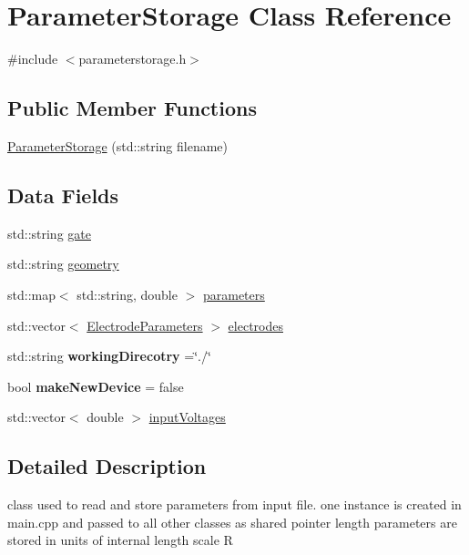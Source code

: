 \hypertarget{classParameterStorage}{}\section{Parameter\+Storage Class Reference}
\label{classParameterStorage}


{\ttfamily \#include $<$parameterstorage.\+h$>$}

\subsection*{Public Member Functions}
\begin{DoxyCompactItemize}
\item 
\hyperlink{classParameterStorage_a024e6d70a1b33d29e64f72657fb15ba8}{Parameter\+Storage} (std\+::string filename)
\end{DoxyCompactItemize}
\subsection*{Data Fields}
\begin{DoxyCompactItemize}
\item 
std\+::string \hyperlink{classParameterStorage_ab870128f261ec92df497b10f85cdc9e0}{gate}
\item 
std\+::string \hyperlink{classParameterStorage_a67fb9f2ff387b416e39c62db6ec85473}{geometry}
\item 
std\+::map$<$ std\+::string, double $>$ \hyperlink{classParameterStorage_a3ae6709dcacaf500c8f57808a52d9be2}{parameters}
\item 
std\+::vector$<$ \hyperlink{structElectrodeParameters}{Electrode\+Parameters} $>$ \hyperlink{classParameterStorage_aec3f7cac18829cd67387d9a568547dbf}{electrodes}
\item 
\mbox{\label{classParameterStorage_a03c07ba0b5172196924d855b07f021c5}} 
std\+::string {\bfseries working\+Direcotry} =\char`\"{}./\char`\"{}
\item 
\mbox{\label{classParameterStorage_a387b9c88ad5b8a77a8f75ac409ab53a2}} 
bool {\bfseries make\+New\+Device} = false
\item 
std\+::vector$<$ double $>$ \hyperlink{classParameterStorage_a139852057ae4212e7365da8f48a8ff1f}{input\+Voltages}
\end{DoxyCompactItemize}


\subsection{Detailed Description}
class used to read and store parameters from input file. one instance is created in main.\+cpp and passed to all other classes as shared pointer length parameters are stored in units of internal length scale R 

